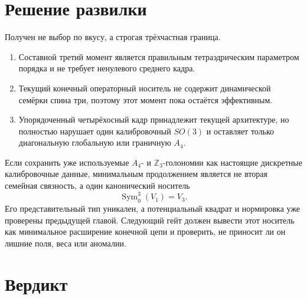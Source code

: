 \section{Решение развилки}

Получен не выбор по вкусу, а строгая трёхчастная граница.
\begin{enumerate}
 \item Составной третий момент является правильным тетраэдрическим
 параметром порядка и не требует ненулевого среднего кадра.
 \item Текущий конечный операторный носитель не содержит динамической
 семёрки спина три, поэтому этот момент пока остаётся эффективным.
 \item Упорядоченный четырёхосный кадр принадлежит текущей архитектуре,
 но полностью нарушает один калибровочный $SO(3)$ и оставляет только
 диагональную глобальную или граничную $A_4$.
\end{enumerate}

Если сохранить уже используемые $A_4$- и $\mathbb Z_3$-голономии как
настоящие дискретные калибровочные данные, минимальным продолжением
является не вторая семейная связность, а один канонический носитель
\begin{equation}
 \operatorname{Sym}^3_0(V_1)=V_3.
 \label{eq:v6-selected-minimal-spin-three-extension}
\end{equation}
Его представительный тип уникален, а потенциальный квадрат и нормировка
уже проверены предыдущей главой. Следующий гейт должен вывести этот
носитель как минимальное расширение конечной цепи и проверить, не приносит
ли он лишние поля, веса или аномалии.

\section{Вердикт}


